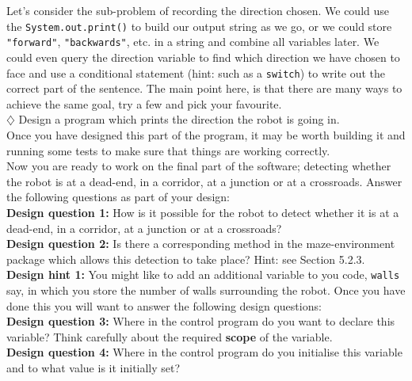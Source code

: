 \noindent
Let's consider the sub-problem of recording the direction chosen.
We could use the {\tt System.out.print()} to build our output string as we go,
or we could store {\tt "forward"}, {\tt "backwards"}, etc. in a string and combine
all variables later. We could even query the direction variable to find which direction
we have chosen to face and use a conditional statement (hint: such as a {\tt switch})
to write out the correct part of the sentence. The main point here, is that there are
many ways to achieve the same goal, try a few and pick your favourite.\\

\noindent
$\diamondsuit$ Design a program which prints the direction the robot is going in.\\

\noindent
Once you have designed this part of the program, it may be worth 
building it and running some tests to make sure that things are working
correctly. \\

\noindent
Now you are ready to work on the final part of the software; detecting 
whether the robot is at a dead-end, in a corridor, at a junction or at a 
crossroads. Answer the 
following questions as part of your design: \\


\noindent
{\bf Design question 1:}
How is it possible for the robot to detect whether it is at a 
dead-end, in a corridor, at a junction or at a 
crossroads? \\

\noindent
{\bf Design question 2:}
Is there a corresponding method in the maze-environment package which allows 
this detection to take place?
Hint: see Section 5.2.3. \\

\noindent
{\bf Design hint 1:}
You might like to add an additional variable to you code, {\tt walls} say, in
which you store the number of walls surrounding the robot. Once you have 
done this you will want to answer the following design questions: \\

\noindent
{\bf Design question 3:}
Where in the control program do you want to declare this variable? Think carefully
about the required {\bf scope} of the variable.\\

\noindent
{\bf Design question 4:}
Where in the control program do you initialise this variable and to what 
value is it initially set?\\

